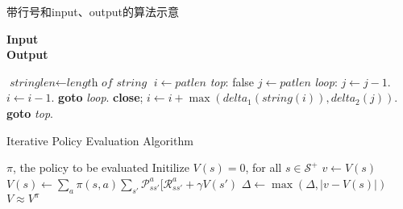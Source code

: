 \documentclass[math,logic,quote,code,mode=simple]{codedumpnote}
\begin{document}
\begin{algorithm}
\caption{带行号和input、output的算法示意}\label{alg:cap}
\hspace*{\algorithmicindent} \textbf{Input} \\
\hspace*{\algorithmicindent} \textbf{Output} 
\begin{algorithmic}[1]
    \State $\textit{stringlen} \gets \textit{length of } \textit{string}$
    \State $i \gets \textit{patlen}$
    \State \emph{top}:
     \Return false
    \EndIf
    \State $j \gets \textit{patlen}$
    \State \emph{loop}:
    \State $j \gets j-1$.
    \State $i \gets i-1$.
    \State \textbf{goto} \emph{loop}.
    \State \textbf{close};
    \EndIf
    \State $i \gets i+\max(\textit{delta}_1(\textit{string}(i)),\textit{delta}_2(j))$.
    \State \textbf{goto} \emph{top}.
    \EndProcedure\end{algorithmic}
\end{algorithm}

\begin{algorithm} 
\caption{Iterative Policy Evaluation Algorithm}
\begin{algorithmic}[1]
\Require $\pi$, the policy to be evaluated
\State Initilize $V(s) = 0$, for all $s \in \mathcal S^+$
\Repeat
{}
\State $v \gets V(s)$
\State $V(s) \gets \sum_a \pi(s,a) \sum_{s'} \mathcal P_{ss'}^a [ \mathcal R_{ss'}^a + \gamma V(s')$
\State $\Delta \gets \max(\Delta, |v- V(s)|)$
\EndFor
{}
\Ensure $V \approx V^\pi$
\end{algorithmic}
\end{algorithm}
\end{document}
